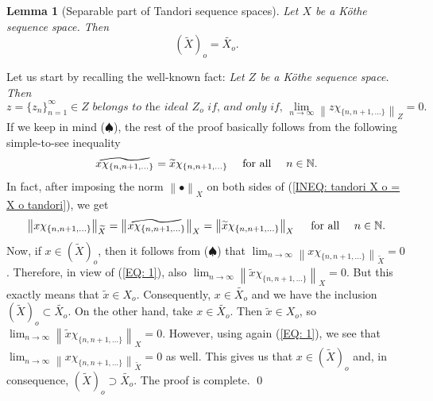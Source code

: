 \documentclass[11pt]{amsart}
\theoremstyle{definition}
\theoremstyle{definition}
\newtheorem{lemma}[theorem]{Lemma}
\theoremstyle{definition}
\theoremstyle{definition}
\theoremstyle{definition}
\theoremstyle{definition}
\theoremstyle{definition}
\theoremstyle{definition}
\numberwithin{equation}{section}
\numberwithin{equation}{section}
\numberwithin{equation}{section}
\theoremstyle{definition}
\theoremstyle{definition}
\theoremstyle{definition}
\theoremstyle{definition}
\theoremstyle{definition}
\theoremstyle{definition}
\newcommand{\norm}[1]{\left\lVert#1\right\rVert}
\renewenvironment{proof}{\noindent {\bf Proof.}}{\qed}
\begin{document}
\begin{lemma}[Separable part of Tandori sequence spaces] \label{LEMMA: OC w Tandori}
	{\it Let $X$ be a K{\" o}the sequence space. Then}
	\begin{equation*}
		( \widetilde{X} )_o = \widetilde{X_o}.
	\end{equation*}
\end{lemma}
\begin{proof}
	Let us start by recalling the well-known fact: {\it Let $Z$ be a K{\" o}the sequence space. Then}
	\begin{equation} \tag{$\spadesuit$}
		z = \{z_n\}_{n=1}^{\infty} \in Z \textit{ belongs to the ideal } Z_o
			\textit{ if, and only if, } \lim\limits_{n \rightarrow \infty} \norm{ z\chi_{\{n,n+1,...\}} }_Z = 0.
	\end{equation}
	If we keep in mind ($\spadesuit$), the rest of the proof basically follows from the following simple-to-see inequality
	\begin{equation} \label{INEQ: tandori X o = X o tandori}
		\stackon[-8pt]{$x\chi_{\{n, n+1, ...\}}$}{\vstretch{1.5}{\hstretch{2.4}{\widetilde{\phantom{\;\;\;\;\;\;\;\;}}}}} = \widetilde{x}\chi_{\{n, n+1, ...\}}
			\quad \text{ for all } \quad n \in \mathbb{N}.
	\end{equation}
	In fact, after imposing the norm $\norm{\bullet}_X$ on both sides of (\ref{INEQ: tandori X o = X o tandori}), we get
	\begin{equation} \label{EQ: 1}
		\norm{x\chi_{\{n, n+1, ...\}}}_{\widetilde{X}} = \norm{\stackon[-8pt]{$x\chi_{\{n, n+1, ...\}}$}{\vstretch{1.5}{\hstretch{2.4}{\widetilde{\phantom{\;\;\;\;\;\;\;\;}}}}}}_X
			= \norm{\widetilde{x}\chi_{\{n, n+1, ...\}}}_X \quad \text{ for all } \quad n \in \mathbb{N}.
	\end{equation}
	Now, if $x \in ( \widetilde{X} )_o$, then it follows from ($\spadesuit$) that $\lim_{n \rightarrow \infty} \norm{x\chi_{\{n, n+1, ...\}}}_{\widetilde{X}} = 0$.
	Therefore, in view of (\ref{EQ: 1}), also $\lim_{n \rightarrow \infty} \norm{\widetilde{x}\chi_{\{n, n+1, ...\}}}_X = 0$.
	But this exactly means that $\widetilde{x} \in X_o$. Consequently, $x \in \widetilde{X_o}$ and we have the inclusion $( \widetilde{X} )_o \subset \widetilde{X_o}$.
	On the other hand, take $x \in \widetilde{X_o}$. Then $\widetilde{x} \in X_o$, so  $\lim_{n \rightarrow \infty} \norm{\widetilde{x}\chi_{\{n, n+1, ...\}}}_X = 0$.
	However, using again (\ref{EQ: 1}), we see that $\lim_{n \rightarrow \infty} \norm{x\chi_{\{n, n+1, ...\}}}_{\widetilde{X}} = 0$ as well.
	This gives us that $x \in ( \widetilde{X} )_o$ and, in consequence, $( \widetilde{X} )_o \supset \widetilde{X_o}$.
	The proof is complete.
\end{proof}
\end{document}

